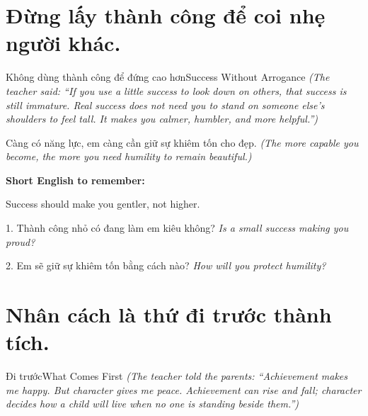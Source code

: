 \section{Đừng lấy thành công để coi nhẹ người khác.}
\begin{truyen}{Không dùng thành công để đứng cao hơn}{Success Without Arrogance}
\textit{(The teacher said: ``If you use a little success to look down on others, that success is still immature. Real success does not need you to stand on someone else's shoulders to feel tall. It makes you calmer, humbler, and more helpful.'')}
\end{truyen}

\begin{baihoc}
Càng có năng lực, em càng cần giữ sự khiêm tốn cho đẹp.
\textit{(The more capable you become, the more you need humility to remain beautiful.)}
\end{baihoc}

\begin{ghinhoanh}
\textbf{Short English to remember:}

Success should make you gentler, not higher.

\end{ghinhoanh}

\begin{tuhocnhanh}
1. Thành công nhỏ có đang làm em kiêu không? \textit{Is a small success making you proud?}

2. Em sẽ giữ sự khiêm tốn bằng cách nào? \textit{How will you protect humility?}
\end{tuhocnhanh}
\ngancach

\section{Nhân cách là thứ đi trước thành tích.}
\begin{truyen}{Đi trước}{What Comes First}
\textit{(The teacher told the parents: ``Achievement makes me happy. But character gives me peace. Achievement can rise and fall; character decides how a child will live when no one is standing beside them.'')}
\end{truyen}

